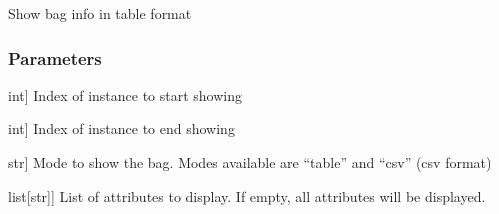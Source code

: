 \documentclass[letterpaper,10pt,english]{sphinxmanual}
\begin{document}
\begin{fulllineitems}
\begin{fulllineitems}
\begin{description}
\end{description}

\end{fulllineitems}


\begin{fulllineitems}
\label{\detokenize{data/_autosummary/miml.data.bag.Bag:miml.data.bag.Bag.show_bag}}
\pysigstartsignatures
{}
\pysigstopsignatures
\sphinxAtStartPar
Show bag info in table format


\subsubsection{Parameters}
\label{\detokenize{data/_autosummary/miml.data.bag.Bag:id19}}\begin{description}
\sphinxlineitem{start}{[}int{]}
\sphinxAtStartPar
Index of instance to start showing

\sphinxlineitem{end}{[}int{]}
\sphinxAtStartPar
Index of instance to end showing

\sphinxlineitem{mode}{[}str{]}
\sphinxAtStartPar
Mode to show the bag. Modes available are “table” and “csv” (csv format)

\sphinxlineitem{attributes}{[}list{[}str{]}{]}
\sphinxAtStartPar
List of attributes to display. If empty, all attributes will be displayed.

\end{description}

\end{fulllineitems}


\end{fulllineitems}
\end{document}
